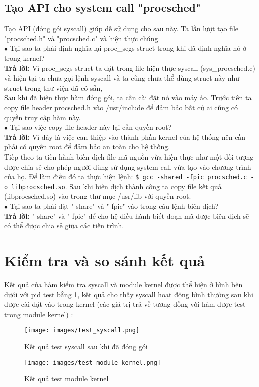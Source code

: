 \documentclass[12pt,a4paper,titlepage]{article}
\begin{document}
	
	\subsection{Tạo API cho system call "procsched"}
	Tạo API (đóng gói syscall) giúp dễ sử dụng cho sau này. Ta lần lượt tạo file
	"procsched.h" và "procsched.c" và hiện thực chúng.\\
	
	$\bullet$ Tại sao ta phải định nghĩa lại proc\_segs struct trong khi đã định
	nghĩa nó ở trong kernel? \\
	\textbf{Trả lời:} Vì proc\_segs struct ta đặt trong file hiện thực
	syscall (sys\_procsched.c) và hiện tại ta chưa gọi lệnh syscall và ta cũng chưa
	thể dùng struct này như struct trong thư viện đã có sẵn,\\
	
	Sau khi đã hiện thực hàm đóng gói, ta cần cài đặt nó vào máy ảo. Trước tiên ta
	copy file header procsched.h vào /usr/include để đảm bảo bất cứ ai cũng có quyền
	truy cập hàm này. \\
	
	$\bullet$ Tại sao việc copy file header này lại cần quyền root?\\
	\textbf{Trả lời:} Vì đây là việc can thiệp vào thành phần kernel của hệ thống nên cần phải có quyền root để đảm bảo an toàn cho hệ thống.\\
	
	Tiếp theo ta tiến hành biên dịch file mã nguồn vừa hiện thực như một đối tượng được chia sẻ cho phép người dùng sử dụng system call vừa tạo vào chương trình của họ. Để làm điều đó ta thực hiện lệnh: \texttt{\$ gcc -shared -fpic procsched.c -o libprocsched.so}. Sau khi biên dịch thành công ta copy file kết quả (libprocsched.so) vào trong thư mục /usr/lib với quyền root.\\
	
	$\bullet$ Tại sao ta phải đặt "-share" và "-fpic" vào trong câu lệnh biên dịch?\\
	\textbf{Trả lời:} "-share" và "-fpic" để cho hệ điều hành biết đoạn mã được biên dịch sẽ có thể được chia sẻ giữa các tiến trình.\\
	\section{Kiểm tra và so sánh kết quả}
	Kết quả của hàm kiểm tra syscall và module kernel được thể hiện ở hình bên dưới với pid test bằng 1, kết quả cho thấy syscall hoạt động bình thường sau khi được cài đặt vào trong kernel (các giá trị trả về tương đồng với hàm được test trong module kernel) :
	
	\begin{figure}[h!]
		\centering
		\caption{Kết quả test syscall sau khi đã đóng gói}
		\texttt{[image: images/test\_syscall.png]}
	\end{figure}
	
	
	\begin{figure}[h!]
		\centering
		\caption{Kết quả test module kernel}
		\texttt{[image: images/test\_module\_kernel.png]}
	\end{figure}
	
\end{document}
